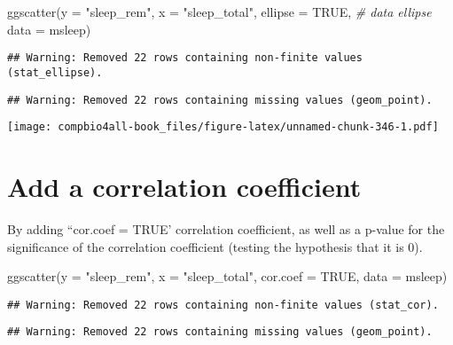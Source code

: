 \documentclass[
]{book}
\newenvironment{Shaded}{\begin{snugshade}}{\end{snugshade}}
\newcommand{\AttributeTok}[1]{\textcolor[rgb]{0.77,0.63,0.00}{#1}}
\newcommand{\CommentTok}[1]{\textcolor[rgb]{0.56,0.35,0.01}{\textit{#1}}}
\newcommand{\ConstantTok}[1]{\textcolor[rgb]{0.00,0.00,0.00}{#1}}
\newcommand{\FunctionTok}[1]{\textcolor[rgb]{0.00,0.00,0.00}{#1}}
\newcommand{\NormalTok}[1]{#1}
\newcommand{\StringTok}[1]{\textcolor[rgb]{0.31,0.60,0.02}{#1}}
\begin{document}
\begin{Shaded}
\begin{Highlighting}[]
\FunctionTok{ggscatter}\NormalTok{(}\AttributeTok{y =} \StringTok{"sleep\_rem"}\NormalTok{,}
          \AttributeTok{x =} \StringTok{"sleep\_total"}\NormalTok{,}
          \AttributeTok{ellipse =} \ConstantTok{TRUE}\NormalTok{,   }\CommentTok{\# data ellipse}
          \AttributeTok{data =}\NormalTok{ msleep)}
\end{Highlighting}
\end{Shaded}

\begin{verbatim}
## Warning: Removed 22 rows containing non-finite values (stat_ellipse).
\end{verbatim}

\begin{verbatim}
## Warning: Removed 22 rows containing missing values (geom_point).
\end{verbatim}

\texttt{[image: compbio4all-book\_files/figure-latex/unnamed-chunk-346-1.pdf]}

\hypertarget{add-a-correlation-coefficient}{%
\section{Add a correlation coefficient}\label{add-a-correlation-coefficient}}

By adding ``cor.coef = TRUE' correlation coefficient, as well as a p-value for the significance of the correlation coefficient (testing the hypothesis that it is 0).

\begin{Shaded}
\begin{Highlighting}[]
\FunctionTok{ggscatter}\NormalTok{(}\AttributeTok{y =} \StringTok{"sleep\_rem"}\NormalTok{,}
          \AttributeTok{x =} \StringTok{"sleep\_total"}\NormalTok{,}
          \AttributeTok{cor.coef =} \ConstantTok{TRUE}\NormalTok{,}
          \AttributeTok{data =}\NormalTok{ msleep)}
\end{Highlighting}
\end{Shaded}

\begin{verbatim}
## Warning: Removed 22 rows containing non-finite values (stat_cor).
\end{verbatim}

\begin{verbatim}
## Warning: Removed 22 rows containing missing values (geom_point).
\end{verbatim}
\end{document}
